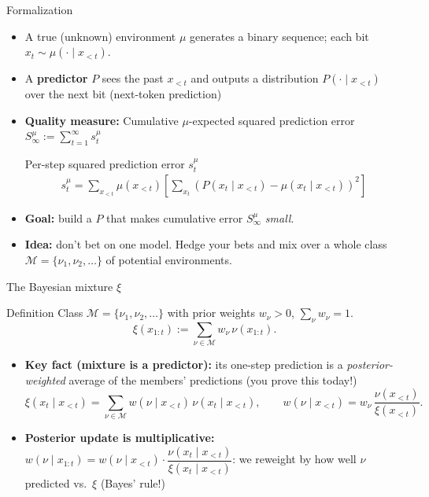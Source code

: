 \documentclass[10pt]{beamer}
\newcommand{\cM}{\mathcal{M}}
\begin{document}
\begin{frame}{Formalization}
\begin{itemize}
    \item A true (unknown) environment $\mu$ generates a binary sequence; each bit
    $x_t \sim \mu(\cdot \mid x_{<t})$.
    \pause
    \item A \textbf{predictor} $P$ sees the past $x_{<t}$ and outputs a distribution
    $P(\cdot \mid x_{<t})$ over the next bit (next-token prediction)
    \pause
    \item \textbf{Quality measure:} Cumulative $\mu$-expected squared prediction error $S_\infty^\mu := \sum_{t=1}^{\infty} s_t^\mu$
    \begin{block}{Per-step squared prediction error $s_t^\mu$}
        \vspace{-2ex}
        \begin{align*}
    s_t^\mu = \sum_{x_{<t}} \mu(x_{<t}) \left[ \sum_{x_t} \left( P(x_t \mid x_{<t}) - \mu(x_t \mid x_{<t}) \right)^2 \right]
    \end{align*}
    \end{block}
    \pause
    \item \textbf{Goal:} build a $P$ that makes cumulative error $S_\infty^\mu$ \emph{small}.
    \pause
    \item \textbf{Idea:} don't bet on one model. Hedge your bets and mix 
    over a whole class $\cM=\{\nu_1,\nu_2,\dots\}$ of potential environments.
\end{itemize}
\end{frame}

\begin{frame}{The Bayesian mixture $\xi$}
\begin{block}{Definition}
Class $\cM=\{\nu_1,\nu_2,\dots\}$ with prior weights $w_\nu>0$, $\sum_\nu w_\nu = 1$.
\[
\xi(x_{1:t}) := \sum_{\nu \in \cM} w_\nu\, \nu(x_{1:t}).
\]
\end{block}
\pause
\begin{itemize}
    \item \textbf{Key fact (mixture is a predictor):} its one-step prediction is a
    \emph{posterior-weighted} average of the members' predictions (you prove this today!)
    \[
    \xi(x_t \mid x_{<t}) = \sum_{\nu \in \cM} w(\nu \mid x_{<t})\, \nu(x_t \mid x_{<t}),
    \qquad
    w(\nu \mid x_{<t}) = w_\nu\,\frac{\nu(x_{<t})}{\xi(x_{<t})}.
    \]
    \pause
    \item \textbf{Posterior update is multiplicative:}
    $w(\nu \mid x_{1:t}) = w(\nu\mid x_{<t})\cdot \dfrac{\nu(x_t\mid x_{<t})}{\xi(x_t\mid x_{<t})}$: we
    reweight by how well $\nu$ predicted vs.\ $\xi$ (Bayes' rule!)
\end{itemize}
\end{frame}
\end{document}
